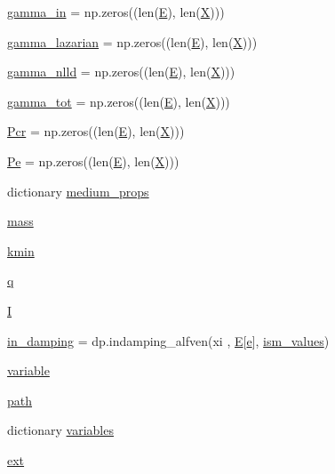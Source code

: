 \begin{DoxyCompactItemize}
\item 
\hyperlink{namespacesetup_a00e0331730c3130543f9852040616ab1}{gamma\+\_\+in} = np.\+zeros((len(\hyperlink{namespacesetup_a8bf3113e27e2925ec3309507c6d5ebf2}{E}), len(\hyperlink{namespacesetup_a0d71901ea06bb31a1b5e9e742158486f}{X})))
\item 
\hyperlink{namespacesetup_ad74ea64c023d17d39c8273fa19749122}{gamma\+\_\+lazarian} = np.\+zeros((len(\hyperlink{namespacesetup_a8bf3113e27e2925ec3309507c6d5ebf2}{E}), len(\hyperlink{namespacesetup_a0d71901ea06bb31a1b5e9e742158486f}{X})))
\item 
\hyperlink{namespacesetup_ad9e96625807078a846052e9e968ee812}{gamma\+\_\+nlld} = np.\+zeros((len(\hyperlink{namespacesetup_a8bf3113e27e2925ec3309507c6d5ebf2}{E}), len(\hyperlink{namespacesetup_a0d71901ea06bb31a1b5e9e742158486f}{X})))
\item 
\hyperlink{namespacesetup_a153d6750beb585c437e244ab6bdb8fba}{gamma\+\_\+tot} = np.\+zeros((len(\hyperlink{namespacesetup_a8bf3113e27e2925ec3309507c6d5ebf2}{E}), len(\hyperlink{namespacesetup_a0d71901ea06bb31a1b5e9e742158486f}{X})))
\item 
\hyperlink{namespacesetup_a1b0b951c6726e43eb28a24e3d79a3758}{Pcr} = np.\+zeros((len(\hyperlink{namespacesetup_a8bf3113e27e2925ec3309507c6d5ebf2}{E}), len(\hyperlink{namespacesetup_a0d71901ea06bb31a1b5e9e742158486f}{X})))
\item 
\hyperlink{namespacesetup_afb73f0e8863cbbacea9afd35ddaa95de}{Pe} = np.\+zeros((len(\hyperlink{namespacesetup_a8bf3113e27e2925ec3309507c6d5ebf2}{E}), len(\hyperlink{namespacesetup_a0d71901ea06bb31a1b5e9e742158486f}{X})))
\item 
dictionary \hyperlink{namespacesetup_ad24dff51841189965fb8f277f6e4dc92}{medium\+\_\+props}
\item 
\hyperlink{namespacesetup_a121b84ea99c5c80a4b93c787d917ad6c}{mass}
\item 
\hyperlink{namespacesetup_a7bc6df070fdda049feea9b88ee5a558f}{kmin}
\item 
\hyperlink{namespacesetup_a8f9219fcf5e99ad6498333cdec29baab}{q}
\item 
\hyperlink{namespacesetup_a80b60e7f494b760103b64ee56d20286d}{I}
\item 
\hyperlink{namespacesetup_ac628de529060bc52e17cbc026eab73fa}{in\+\_\+damping} = dp.\+indamping\+\_\+alfven(xi , \hyperlink{namespacesetup_a8bf3113e27e2925ec3309507c6d5ebf2}{E}\mbox{[}\hyperlink{constants_8h_a2b076531cd50c7b55702a53221f2ac72}{e}\mbox{]}, \hyperlink{namespacesetup_ae9743eacdcbd49599d43d5f99093a3d7}{ism\+\_\+values})
\item 
\hyperlink{namespacesetup_a3e426d7a0fddfef14385f639c07962a4}{variable}
\item 
\hyperlink{namespacesetup_a7951a015fdeba223e18f4bc68c9a6e5e}{path}
\item 
dictionary \hyperlink{namespacesetup_a46c3d10a9b44fbab0c274bcaacba2bcf}{variables}
\item 
\hyperlink{namespacesetup_a8345a57adf0c9566a76dd0fa6dbba6df}{ext}
\end{DoxyCompactItemize}


